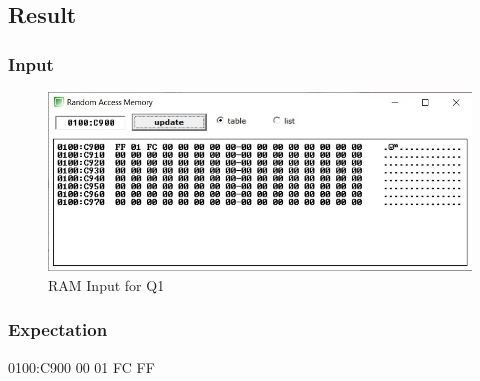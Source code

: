 \documentclass{article}
\begin{document}
\break
\subsection{Result}
\subsubsection{Input}
\begin{figure}[h]
\begin{center}
\includegraphics[width=1.0\textwidth]{SORT_IN} 
\caption{RAM Input for Q1}
\end{center}
\end{figure}

\subsubsection{Expectation}
0100:C900   00 01 FC FF \\

\break
\end{document}
